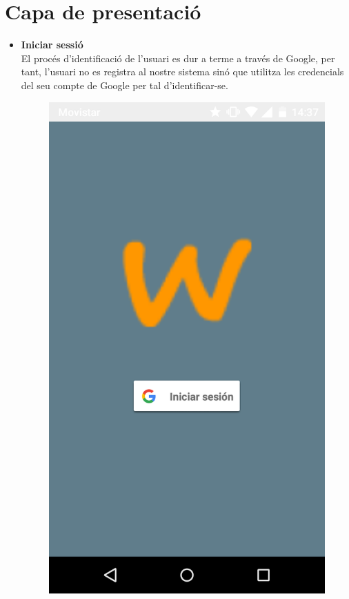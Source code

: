 \section{Capa de presentació}
\begin{itemize}

\item[]{\textbf{Iniciar sessió}}\\
El procés d'identificació de l'usuari es dur a terme a través de Google, per tant, l'usuari no es registra al nostre sistema sinó que utilitza les credencials del seu compte de Google per tal d'identificar-se.



\begin{figure}[!h]
\centering
\includegraphics[scale=0.15]{Figures/initSesion.png}

\end{figure}
\end{itemize}
